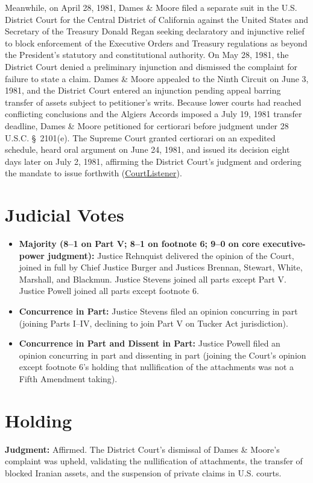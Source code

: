 \documentclass[12pt]{article}
\begin{document}
Meanwhile, on April 28, 1981, Dames \& Moore filed a separate suit in the U.S. District Court for the Central District of California against the United States and Secretary of the Treasury Donald Regan seeking declaratory and injunctive relief to block enforcement of the Executive Orders and Treasury regulations as beyond the President's statutory and constitutional authority. On May 28, 1981, the District Court denied a preliminary injunction and dismissed the complaint for failure to state a claim. Dames \& Moore appealed to the Ninth Circuit on June 3, 1981, and the District Court entered an injunction pending appeal barring transfer of assets subject to petitioner's writs. Because lower courts had reached conflicting conclusions and the Algiers Accords imposed a July 19, 1981 transfer deadline, Dames \& Moore petitioned for certiorari before judgment under 28 U.S.C. \S\ 2101(e). The Supreme Court granted certiorari on an expedited schedule, heard oral argument on June 24, 1981, and issued its decision eight days later on July 2, 1981, affirming the District Court's judgment and ordering the mandate to issue forthwith (\href{https://www.courtlistener.com/opinion/110564/dames-moore-v-regan/}{CourtListener}).

\section{Judicial Votes}
\begin{itemize}
  \item \textbf{Majority (8--1 on Part V; 8--1 on footnote 6; 9--0 on core executive-power judgment):} Justice Rehnquist delivered the opinion of the Court, joined in full by Chief Justice Burger and Justices Brennan, Stewart, White, Marshall, and Blackmun. Justice Stevens joined all parts except Part V. Justice Powell joined all parts except footnote 6.
  \item \textbf{Concurrence in Part:} Justice Stevens filed an opinion concurring in part (joining Parts I--IV, declining to join Part V on Tucker Act jurisdiction).
  \item \textbf{Concurrence in Part and Dissent in Part:} Justice Powell filed an opinion concurring in part and dissenting in part (joining the Court's opinion except footnote 6's holding that nullification of the attachments was not a Fifth Amendment taking).
\end{itemize}

\section{Holding}
\textbf{Judgment:} Affirmed. The District Court's dismissal of Dames \& Moore's complaint was upheld, validating the nullification of attachments, the transfer of blocked Iranian assets, and the suspension of private claims in U.S. courts.
\end{document}
